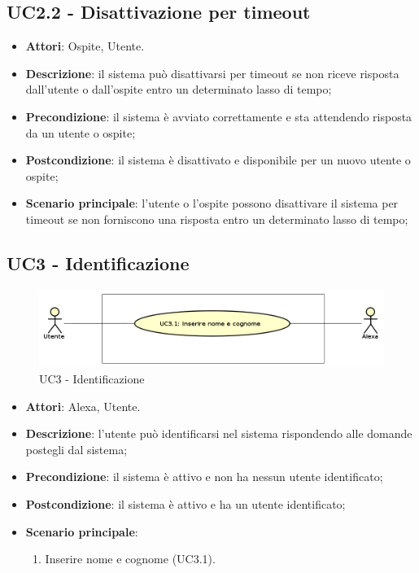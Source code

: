 \documentclass[../AnalisiDeiRequisiti_v4.0.0.tex]{subfiles}
\begin{document}
\subsection{UC2.2 - Disattivazione per timeout} 
\label{sssec:UC2.2} 
\begin{itemize} 
\item \textbf{Attori}: Ospite, Utente.
\item \textbf{Descrizione}: il sistema può disattivarsi per timeout se non riceve risposta dall'utente o dall'ospite entro un determinato lasso di tempo;
\item \textbf{Precondizione}: il sistema è avviato correttamente e sta attendendo risposta da un utente o ospite;
\item \textbf{Postcondizione}: il sistema è disattivato e disponibile per un nuovo utente o ospite;
\item \textbf{Scenario principale}: l'utente o l'ospite possono disattivare il sistema per timeout se non forniscono una risposta entro un determinato lasso di tempo;
\end{itemize} 
\subsection{UC3 - Identificazione} 
\label{sssec:UC3} 
\begin{figure}[!h]
	\centering
	\includegraphics[width=\textwidth]{UseCases/UC3_Identificazione/UC3_Identificazione.png}
	\caption{UC3 - Identificazione}
\end{figure}
\begin{itemize} 
\item \textbf{Attori}: Alexa, Utente.
\item \textbf{Descrizione}: l'utente può identificarsi nel sistema rispondendo alle domande postegli dal sistema;
\item \textbf{Precondizione}: il sistema è attivo e non ha nessun utente identificato;
\item \textbf{Postcondizione}: il sistema è attivo e ha un utente identificato;
\item \textbf{Scenario principale}: \begin{enumerate}\item Inserire nome e cognome (UC3.1). 
 \end{enumerate}
\end{itemize} 
\end{document}
